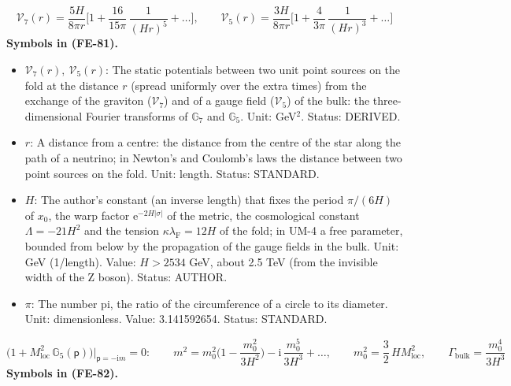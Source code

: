 \documentclass[
  10pt,
]{article}
\providecommand{\tightlist}{%
  \setlength{\itemsep}{0pt}\setlength{\parskip}{0pt}}
\begin{document}
\[
\mathcal{V}_7(r) = \frac{5H}{8\pi r}\Big[1 + \frac{16}{15\pi}\,\frac{1}{(Hr)^5} + \dots\Big],\qquad
\mathcal{V}_5(r) = \frac{3H}{8\pi r}\Big[1 + \frac{4}{3\pi}\,\frac{1}{(Hr)^3} + \dots\Big] \tag{FE-81}
\] \textbf{Symbols in (FE-81).}

\begin{itemize}
\tightlist
\item
  \(\mathcal{V}_7(r),\ \mathcal{V}_5(r)\): The static potentials between
  two unit point sources on the fold at the distance \(r\) (spread
  uniformly over the extra times) from the exchange of the graviton
  (\(\mathcal{V}_7\)) and of a gauge field (\(\mathcal{V}_5\)) of the
  bulk: the three-dimensional Fourier transforms of \(\mathbb{G}_7\) and
  \(\mathbb{G}_5\). Unit: GeV\(^2\). Status: DERIVED.
\item
  \(r\): A distance from a centre: the distance from the centre of the
  star along the path of a neutrino; in Newton's and Coulomb's laws the
  distance between two point sources on the fold. Unit: length. Status:
  STANDARD.
\item
  \(H\): The author's constant (an inverse length) that fixes the period
  \(\pi/(6H)\) of \(x_0\), the warp factor
  \(\mathrm{e}^{-2H\lvert\sigma\rvert}\) of the metric, the cosmological
  constant \(\Lambda = -21H^2\) and the tension
  \(\kappa\lambda_{\mathrm{F}} = 12H\) of the fold; in UM-4 a free
  parameter, bounded from below by the propagation of the gauge fields
  in the bulk. Unit: GeV (1/length). Value: \(H > 2534\) GeV, about 2.5
  TeV (from the invisible width of the Z boson). Status: AUTHOR.
\item
  \(\pi\): The number pi, the ratio of the circumference of a circle to
  its diameter. Unit: dimensionless. Value: 3.141592654. Status:
  STANDARD.
\end{itemize}

\[
\Big(1 + M_{\mathrm{loc}}^2\,\mathbb{G}_5(\mathsf{p})\Big)\Big\vert_{\mathsf{p} = -\mathrm{i}m} = 0:\qquad
m^2 = m_0^2\Big(1 - \frac{m_0^2}{3H^2}\Big) - \mathrm{i}\,\frac{m_0^5}{3H^3} + \dots,\qquad
m_0^2 = \frac32\,H M_{\mathrm{loc}}^2,\qquad \Gamma_{\mathrm{bulk}} = \frac{m_0^4}{3H^3} \tag{FE-82}
\] \textbf{Symbols in (FE-82).}
\end{document}
